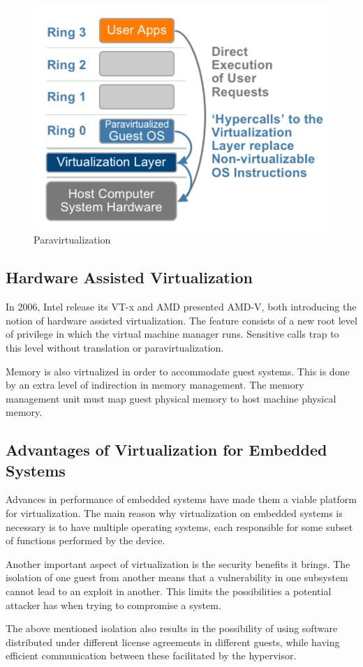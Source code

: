 \begin{figure}[h]
\centering
  \includegraphics[width=.4\linewidth]{img/paravirt.png}
  \caption{Paravirtualization}
\end{figure}

\subsection{Hardware Assisted Virtualization}
\label{subsec:havirt}

In 2006, Intel release its VT-x and AMD presented AMD-V, both introducing the notion of hardware assisted virtualization. The feature consists of a new root level of privilege in which the virtual machine manager runs. Sensitive calls trap to this level without  translation or paravirtualization.

Memory is also virtualized in order to accommodate guest systems. This is done by an extra level of indirection in memory management. The memory management unit must map guest physical memory to host machine physical memory.

\subsection{Advantages of Virtualization for Embedded Systems}
\label{subsec:advvirt}

Advances in performance of embedded systems have made them a viable platform for virtualization. The main reason why virtualization on embedded systems is necessary is to have multiple operating systems, each responsible for some subset of functions performed by the device.

Another important aspect of virtualization is the security benefits it brings. The isolation of one guest from another means that a vulnerability in one subsystem cannot lead to an exploit in another. This limits the possibilities a potential attacker has when trying to compromise a system.

The above mentioned isolation also results in the possibility of using software distributed under different license agreements in different guests, while having efficient communication between these facilitated by the hypervisor.

